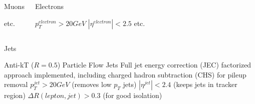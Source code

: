 {\begin{columns}[T]
\begin{block}{Muons}
\begin{itemize}
{          \myitem etc.
        }
      \end{itemize}
    \end{block}
    \column{5.8cm}
    \begin{block}{Electrons}
      \begin{itemize}
        \tiny{
          \myitem $p_{T}^{electron}>20\unit{GeV}$
          \myitem $|\eta^{electron}|<2.5$
          \myitem etc.
        }
      \end{itemize}
    \end{block}
  \end{columns}
  \vspace*{-0.15cm}
  \begin{block}{Jets}
    \begin{itemize}
      \tiny{
        \myitem Anti-kT ($R=0.5$) Particle Flow Jets
        \myitem Full jet energy correction (JEC) factorized approach
        implemented, including charged hadron subtraction (CHS) for
        pileup removal
        \myitem $p_{T}^{jet}>20\unit{GeV}$ (removes low $p_{T}$ jets)
        \myitem $|\eta^{jet}|<2.4$ (keeps jets in tracker region)
        \myitem ${\Delta}R(lepton,jet)>0.3$ (for good isolation)
      }
    \end{itemize}
  \end{block}
}
